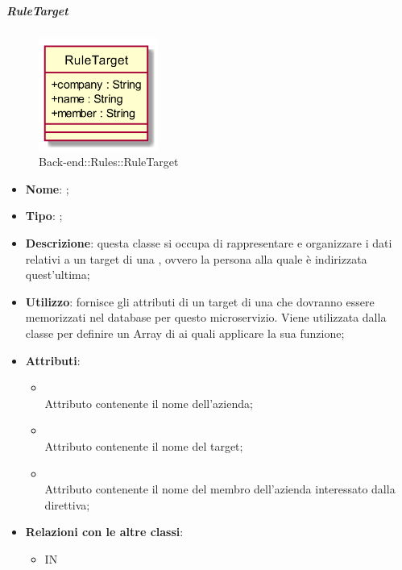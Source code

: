 \hypertarget{RuleTarget_label}{\subparagraph{RuleTarget}}
\begin{figure}[h]
	\centering
	\includegraphics[width=0.35\textwidth,height=\textheight,keepaspectratio]{images/ClassRuleTarget.png}
	\caption{Back-end::Rules::RuleTarget}
\end{figure}
\begin{itemize}
	\item \textbf{Nome}: ;
	\item \textbf{Tipo}: ;
	\item \textbf{Descrizione}: questa classe si occupa di rappresentare e organizzare i dati relativi a un target di una , ovvero la persona alla quale è indirizzata quest'ultima;
	\item \textbf{Utilizzo}: fornisce gli attributi di un target di una  che dovranno essere memorizzati nel database per questo microservizio.
	Viene utilizzata dalla classe  per definire un Array di  ai quali applicare la sua funzione;
	\item \textbf{Attributi}:
	\begin{itemize}
		\item[]  \\
		Attributo contenente il nome dell'azienda;
		\item[]  \\
		Attributo contenente il nome del target;
		\item[]  \\
		Attributo contenente il nome del membro dell'azienda interessato dalla direttiva;
	\end{itemize}
	\item \textbf{Relazioni con le altre classi}:
	\begin{itemize}
		\item IN \hyperlink{Rule_label}{}
	\end{itemize}
\end{itemize}
\FloatBarrier

